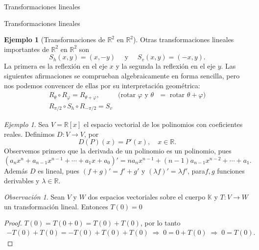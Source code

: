 \documentclass[a4paper,12pt,twoside,spanish,reqno]{amsbook}
\numberwithin{equation}{section}
\theoremstyle{definition}
\newtheorem{ejemplo}[teorema]{Ejemplo}
\theoremstyle{remark}
\newtheorem*{ejemplo*}{Ejemplo}
\newtheorem*{obs*}{Observaci\'on}
\newcommand{\R}{\mathbb R}
\newcommand{\K}{\mathbb K}
\begin{document}
\begin{chapter}{Transformaciones lineales}
\begin{section}{Transformaciones lineales}
\begin{ejemplo}[{\sc Transformaciones de $\R^2$ en $\R^2$}]
                
                
                Otras transformaciones lineales importantes de $\R^2$ en $\R^2$ son 
                $$
                S_h(x,y) = (x,-y) \quad \text{ y } \quad S_v(x,y) = (-x,y).
                $$
                La primera es la reflexión en el eje $x$ y la segunda la reflexión en el eje $y$. Las siguientes afirmaciones se comprueban algebraicamente en forma sencilla, pero nos podemos convencer de ellas por su interpretación geométrica:
                \begin{equation*}
                \begin{array}{ll}
                R_\theta \circ R_\varphi = R_{\theta +\varphi}, \quad &\text{(rotar $\varphi$ y $\theta$ $=$  rotar $\theta+\varphi$)} \\
                R_{\pi/2} \circ S_h \circ R_{-\pi/2} = S_v&
                \end{array}
                \end{equation*}
                
            \end{ejemplo}
    
        
            \begin{ejemplo*}
            Sea $V = \R[x]$ el espacio vectorial de los polinomios con coeficientes reales. Definimos $D:V \to V$, por
            $$
            D(P)(x) = P'(x),\quad x \in \R. 
            $$
            Observemos primero que la derivada de un polinomio es un polinomio, pues 
            $$
            (a_nx^n+ a_{n-1}x^{n-1}+\cdots + a_1 x + a_0)' = na_nx^{n-1}+ (n-1)a_{n-1}x^{n-2}+\cdots + a_1.
            $$
            Además  $D$  es lineal, pues $(f+g)' = f' + g'$ y $(\lambda f)' = \lambda f'$, para$f,g$ funciones derivables y $\lambda \in \R$.
            \end{ejemplo*} 
        
        \begin{obs*}	Sean $V$ y $W$ dos espacios vectoriales sobre el cuerpo $\K$ y 	 $T:V \to W$			un transformación lineal. Entonces $T(0) =0$
        \end{obs*}
        \begin{proof} $T(0) = T(0+0) = T(0) + T(0)$, por lo tanto 
            \begin{align*}
                -T(0) + T(0) = -T(0) + T(0)+T(0) \;\Rightarrow\; 0 = 0 +T(0) \;\Rightarrow\; 0= T(0).
            \end{align*}
        \end{proof}
        

\end{section}
\end{chapter}
\end{document}

